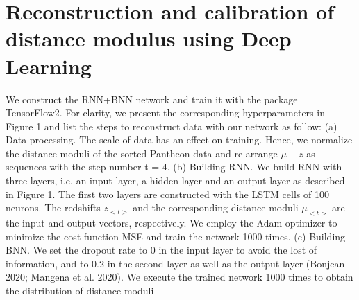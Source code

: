 \section{Reconstruction and calibration of distance modulus using Deep Learning}
We construct the RNN+BNN network and train it with the package TensorFlow2\cite{tensorflow2015-whitepaper}. For clarity, we present the corresponding hyperparameters in Figure 1 and list the steps to reconstruct data with our network as follow: (a) Data processing. The scale of data has an effect on training. Hence, we normalize the distance moduli of the sorted Pantheon data and re-arrange $\mu-z$ as sequences with the step number t = 4. (b) Building RNN. We build RNN with three layers, i.e. an input layer, a hidden layer and an output layer as described in Figure 1. The first two layers are constructed with the LSTM cells of 100 neurons. The redshifts $z_{<t>}$ and the corresponding distance moduli $\mu_{<t>}$ are the input and output vectors, respectively. We employ the Adam optimizer to minimize the cost function MSE and train the network 1000 times. (c) Building BNN. We set the dropout rate to 0 in the input layer to avoid the lost of information, and to 0.2 in the second layer as well as the output layer (Bonjean 2020; Mangena et al. 2020). We execute the trained network 1000 times to obtain the distribution of distance moduli



